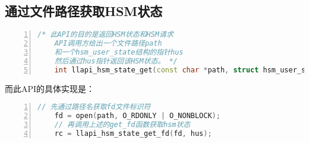 \subsection{通过文件路径获取HSM状态}

\begin{lstlisting}[language={c++},numbers=left]
    /* 此API的目的是返回HSM状态和HSM请求
    API调用方给出一个文件路径path
    和一个hsm_user_state结构的指针hus
    然后通过hus指针返回该HSM状态。 */
    int llapi_hsm_state_get(const char *path, struct hsm_user_state *hus);
\end{lstlisting}

而此API的具体实现是：
\begin{lstlisting}[language={c++},numbers=left]
    // 先通过路径名获取fd文件标识符 
    fd = open(path, O_RDONLY | O_NONBLOCK);
    // 再调用上述的get_fd函数获取hsm状态
    rc = llapi_hsm_state_get_fd(fd, hus);
\end{lstlisting}

